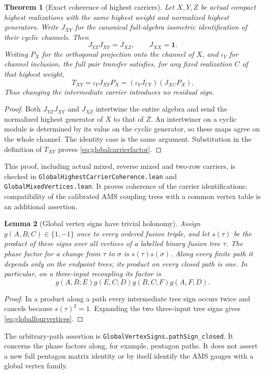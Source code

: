 \documentclass[10pt,a4paper]{article}
\newtheorem{theorem}{Theorem}
\newtheorem{lemma}[theorem]{Lemma}
\newcommand{\id}{\mathbf 1}
\newcommand{\lean}[1]{{\small\nolinkurl{#1}}}
\newenvironment{revision}{\begingroup}{\endgroup}
\begin{document}
\begin{revision}
\begin{theorem}[Exact coherence of highest carriers]\label{thm:globalcarrier}
Let $X,Y,Z$ be actual compact highest realizations with the same highest
weight and normalized highest generators. Write $J_{XY}$ for the
canonical full-algebra isometric identification of their cyclic
channels. Then
\[
 J_{YZ}J_{XY}=J_{XZ},\qquad J_{XX}=\id.
\]
Writing $P_X$ for the orthogonal projection onto the channel of $X$,
and $\iota_Y$ for channel inclusion, the full pair transfer satisfies,
for any fixed realization $C$ of that highest weight,
\begin{equation}\label{eq:globalcarrierfactor}
 T_{XY}=\iota_YJ_{XY}P_X
       =(\iota_YJ_{CY})(J_{XC}P_X).
\end{equation}
Thus changing the intermediate carrier introduces no residual sign.
\end{theorem}
\begin{proof}
Both $J_{YZ}J_{XY}$ and $J_{XZ}$ intertwine the entire algebra and send
the normalized highest generator of $X$ to that of $Z$. An intertwiner
on a cyclic module is determined by its value on the cyclic generator,
so these maps agree on the whole channel. The identity case is the same
argument. Substitution in the definition of $T_{XY}$ proves
\eqref{eq:globalcarrierfactor}.
\end{proof}
This proof, including actual mixed, reverse mixed and two-row carriers,
is checked in \lean{GlobalHighestCarrierCoherence.lean} and
\lean{GlobalMixedVertices.lean}. It proves coherence of the carrier
identifications; compatibility of the calibrated AMS coupling trees
with a common vertex table is an additional assertion.

\begin{lemma}[Global vertex signs have trivial holonomy]\label{lem:globalphases}
Assign $g(A,B;C)\in\{1,-1\}$ once to every ordered fusion triple, and
let $s(\tau)$ be the product of these signs over all vertices of a
labelled binary fusion tree $\tau$. The phase factor for a change from
$\tau$ to $\sigma$ is $s(\tau)s(\sigma)$. Along every finite path it
depends only on the endpoint trees; its product on every closed path is
one. In particular, on a three-input recoupling its factor is
\begin{equation}\label{eq:globalfourvertices}
 g(A,B;E)g(E,C;D)g(B,C;F)g(A,F;D).
\end{equation}
\end{lemma}
\begin{proof}
In a product along a path every intermediate tree sign occurs twice
and cancels because $s(\tau)^2=1$. Expanding the two three-input tree
signs gives \eqref{eq:globalfourvertices}.
\end{proof}
The arbitrary-path assertion is
\lean{GlobalVertexSigns.pathSign_closed}. It concerns the phase factors
along, for example, pentagon paths. It does not assert a new full
pentagon matrix identity or by itself identify the AMS gauges with a
global vertex family.


\end{revision}
\end{document}
